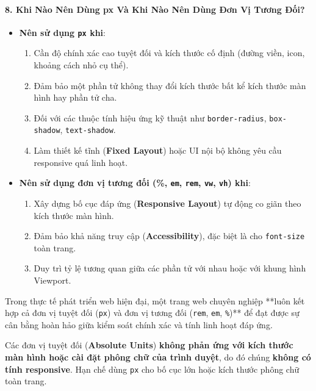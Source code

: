 \documentclass[11pt,oneside]{book}
\newcommand{\codeinline}[1]{\textcolor{accentOrange}{\texttt{#1}}}
\newcommand{\term}[1]{\textbf{\textcolor{primaryBlue}{#1}}}
\begin{document}
\paragraph{8. Khi Nào Nên Dùng px Và Khi Nào Nên Dùng Đơn Vị Tương Đối?}
\begin{itemize}[leftmargin=1.5em, itemsep=3pt, parsep=0pt]
    \item \textbf{Nên sử dụng \codeinline{px} khi}:
    \begin{enumerate}[leftmargin=1.2em, itemsep=2pt, parsep=0pt]
        \item Cần độ chính xác cao tuyệt đối và kích thước cố định (đường viền, icon, khoảng cách nhỏ cụ thể).
        \item Đảm bảo một phần tử không thay đổi kích thước bất kể kích thước màn hình hay phần tử cha.
        \item Đối với các thuộc tính hiệu ứng kỹ thuật như \codeinline{border-radius}, \codeinline{box-shadow}, \codeinline{text-shadow}.
        \item Làm thiết kế tĩnh (\term{Fixed Layout}) hoặc UI nội bộ không yêu cầu responsive quá linh hoạt.
    \end{enumerate}
    \item \textbf{Nên sử dụng đơn vị tương đối (\%, \codeinline{em}, \codeinline{rem}, \codeinline{vw}, \codeinline{vh}) khi}:
    \begin{enumerate}[leftmargin=1.2em, itemsep=2pt, parsep=0pt]
        \item Xây dựng bố cục đáp ứng (\term{Responsive Layout}) tự động co giãn theo kích thước màn hình.
        \item Đảm bảo khả năng truy cập (\term{Accessibility}), đặc biệt là cho \codeinline{font-size} toàn trang.
        \item Duy trì tỷ lệ tương quan giữa các phần tử với nhau hoặc với khung hình Viewport.
    \end{enumerate}
\end{itemize}

\begin{noteBox}
Trong thực tế phát triển web hiện đại, một trang web chuyên nghiệp **luôn kết hợp cả đơn vị tuyệt đối (\codeinline{px}) và đơn vị tương đối (\codeinline{rem}, \codeinline{em}, \codeinline{\%})** để đạt được sự cân bằng hoàn hảo giữa kiểm soát chính xác và tính linh hoạt đáp ứng.
\end{noteBox}

\begin{warnBox}
Các đơn vị tuyệt đối (\term{Absolute Units}) \textbf{không phản ứng với kích thước màn hình hoặc cài đặt phông chữ của trình duyệt}, do đó chúng \textbf{không có tính responsive}. Hạn chế dùng \codeinline{px} cho bố cục lớn hoặc kích thước phông chữ toàn trang.
\end{warnBox}
\end{document}
